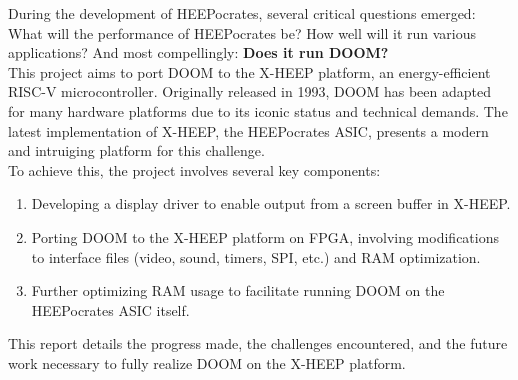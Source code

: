 During the development of HEEPocrates, several critical questions emerged: What will the performance of HEEPocrates be? How well will it run various applications? And most compellingly: \textbf{Does it run DOOM?} \\

This project aims to port DOOM to the X-HEEP platform, an energy-efficient RISC-V microcontroller. Originally released in 1993, DOOM has been adapted for many hardware platforms due to its iconic status and technical demands. The latest implementation of X-HEEP, the HEEPocrates ASIC, presents a modern and intruiging platform for this challenge. \\

To achieve this, the project involves several key components: \\

\begin{enumerate}
    \item Developing a display driver to enable output from a screen buffer in X-HEEP.
    \item Porting DOOM to the X-HEEP platform on FPGA, involving modifications to interface files (video, sound, timers, SPI, etc.) and RAM optimization.
    \item Further optimizing RAM usage to facilitate running DOOM on the HEEPocrates ASIC itself.
\end{enumerate}

This report details the progress made, the challenges encountered, and the future work necessary to fully realize DOOM on the X-HEEP platform.